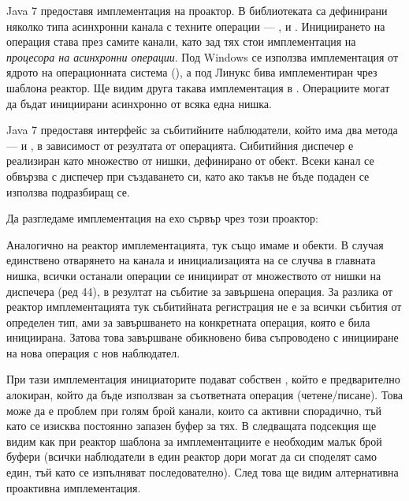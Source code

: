 Java 7 предоставя имплементация на проактор. В библиотеката са дефинирани няколко типа асинхронни канала с техните операции — ,  и . Инициирането на операция става през самите канали, като зад тях стои имплементация на \emph{процесора на асинхронни операции}. Под Windows се използва имплементация от ядрото на операционната система (), а под Линукс бива имплементиран чрез шаблона реактор. Ще видим друга такава имплементация в . Операциите могат да бъдат инициирани асинхронно от всяка една нишка.

Java 7 предоставя интерфейс  за събитийните наблюдатели, който има два метода —  и , в зависимост от резултата от операцията. Сибитийния диспечер е реализиран като множество от нишки, дефинирано от  обект. Всеки канал се обвързва с диспечер при създаването си, като ако такъв не бъде подаден се използва подразбиращ се.

Да разгледаме имплементация на ехо сървър чрез този проактор:



Аналогично на реактор имплементацията, тук също имаме  и  обекти. В случая единствено отварянето на канала и инициализацията на  се случва в главната нишка, всички останали операции се инициират от множеството от нишки на диспечера (ред 44), в резултат на събитие за завършена операция. За разлика от реактор имплементацията тук събитийната регистрация не е за всички събития от определен тип, ами за завършването на конкретната операция, която е била инициирана. Затова това завършване обикновено бива съпроводено с иницииране на нова операция с нов наблюдател.

При тази имплементация инициаторите подават собствен , който е предварително алокиран, който да бъде използван за съответната операция (четене/писане). Това може да е проблем при голям брой канали, които са активни спорадично, тъй като се изисква постоянно запазен буфер за тях. В следващата подсекция ще видим как при реактор шаблона за имплементациите е необходим малък брой буфери (всички наблюдатели в един реактор дори могат да си споделят само един, тъй като се изпълняват последователно). След това ще видим алтернативна проактивна имплементация.

